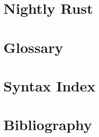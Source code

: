 \documentclass[fontsize=11pt,oneside,a5paper]{scrbook}
\begin{document}
    \blankpage
    \chapter{Nightly Rust}
    \label{sec:nightly_rust}
    
    
    \blankpage
    \chapter{Glossary}
    \label{sec:glossary}
    
    
    \blankpage
    \chapter{Syntax Index}
    \label{sec:syntax_index}
    
    \blankpage
    \chapter{Bibliography}
    \label{sec:bib}
    
    
\end{document}
